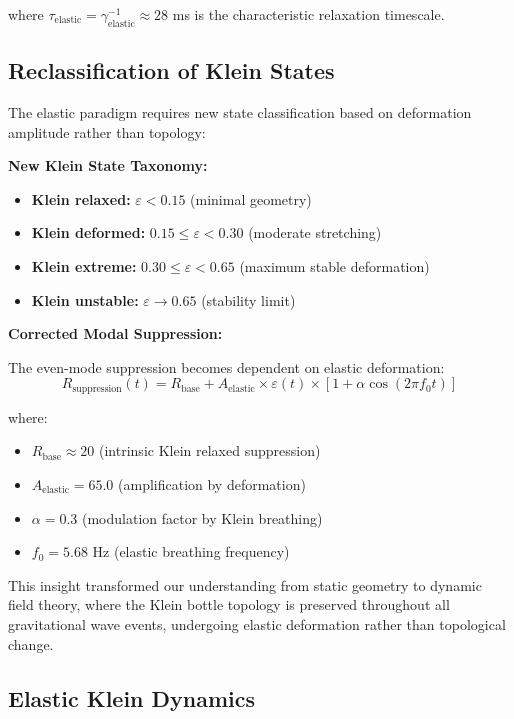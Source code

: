\documentclass[12pt]{iopart}
\begin{document}
where $\tau_{\text{elastic}} = \gamma_{\text{elastic}}^{-1} \approx 28$ ms is the characteristic relaxation timescale.

\subsection{Reclassification of Klein States}

The elastic paradigm requires new state classification based on deformation amplitude rather than topology:

\textbf{New Klein State Taxonomy:}
\begin{itemize}
\item \textbf{Klein relaxed:} $\varepsilon < 0.15$ (minimal geometry)
\item \textbf{Klein deformed:} $0.15 \leq \varepsilon < 0.30$ (moderate stretching)
\item \textbf{Klein extreme:} $0.30 \leq \varepsilon < 0.65$ (maximum stable deformation)
\item \textbf{Klein unstable:} $\varepsilon \to 0.65$ (stability limit)
\end{itemize}

\textbf{Corrected Modal Suppression:}

The even-mode suppression becomes dependent on elastic deformation:
\begin{equation}
R_{\text{suppression}}(t) = R_{\text{base}} + A_{\text{elastic}} \times \varepsilon(t) \times [1 + \alpha \cos(2\pi f_0 t)]
\end{equation}

where:
\begin{itemize}
\item $R_{\text{base}} \approx 20$ (intrinsic Klein relaxed suppression)
\item $A_{\text{elastic}} = 65.0$ (amplification by deformation)
\item $\alpha = 0.3$ (modulation factor by Klein breathing)
\item $f_0 = 5.68$ Hz (elastic breathing frequency)
\end{itemize}

This insight transformed our understanding from static geometry to dynamic field theory, where the Klein bottle topology is preserved throughout all gravitational wave events, undergoing elastic deformation rather than topological change.

\subsection{Elastic Klein Dynamics}
\end{document}
